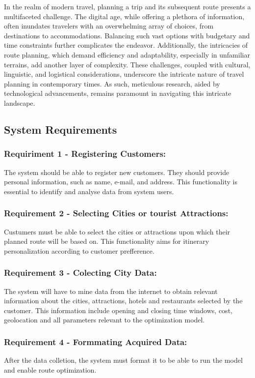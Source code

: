 In the realm of modern travel, planning a trip and its subsequent route presents a multifaceted challenge. The digital age, while offering a plethora of information, often inundates travelers with an overwhelming array of choices, from destinations to accommodations. Balancing such vast options with budgetary and time constraints further complicates the endeavor. Additionally, the intricacies of route planning, which demand efficiency and adaptability, especially in unfamiliar terrains, add another layer of complexity. These challenges, coupled with cultural, linguistic, and logistical considerations, underscore the intricate nature of travel planning in contemporary times. As such, meticulous research, aided by technological advancements, remains paramount in navigating this intricate landscape.

\subsection*{System Requirements}

\subsubsection*{Requiriment 1 - Registering Customers:} The system should be able to register new customers. They should provide personal information, such as name, e-mail, and address. This functionality is essential to identify and analyse data from system users.

\subsubsection*{Requirement 2 - Selecting Cities or tourist Attractions:} Custumers must be able to select the cities or attractions upon which their planned route will be based on.  This functionality aims for itinerary personalization according to customer prefference.

\subsubsection*{Requirement 3 - Colecting City Data:} The system will have to mine data from the internet to obtain relevant information about the cities, attractions, hotels and restaurants selected by the customer. This information include opening and closing time windows, cost, geolocation and all parameters relevant to the optimization model. 

\subsubsection*{Requirement 4 - Formmating Acquired Data:} After the data colletion, the system must format it to be able to run the model and enable route optimization.

